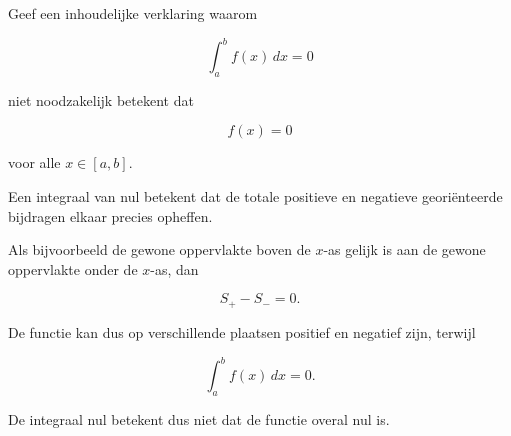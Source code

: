 \documentclass{ximera}
\begin{document}
\begin{oefening}{\oefU\ESS}

Geef een inhoudelijke verklaring waarom

\[
\int_a^b f(x)\,dx=0
\]

niet noodzakelijk betekent dat

\[
f(x)=0
\]

voor alle \(x\in[a,b]\).

\begin{oplossing}
Een integraal van nul betekent dat de totale positieve en negatieve
georiënteerde bijdragen elkaar precies opheffen.

Als bijvoorbeeld de gewone oppervlakte boven de \(x\)-as gelijk is aan
de gewone oppervlakte onder de \(x\)-as, dan

\[
S_+-S_-=0.
\]

De functie kan dus op verschillende plaatsen positief en negatief zijn,
terwijl

\[
\boxed{\int_a^b f(x)\,dx=0}.
\]

De integraal nul betekent dus niet dat de functie overal nul is.
\end{oplossing}

\end{oefening}


\end{document}
